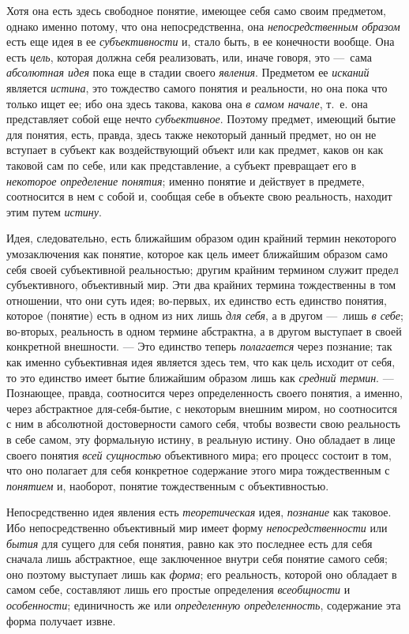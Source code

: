 \documentclass[twoside]{article}
\begin{document}
{Хотя она есть здесь свободное понятие, имеющее себя само своим
предметом, однако именно потому, что она непосредственна, она
{\em непосредственным образом}
есть еще идея в ее
{\em субъективности} и,
стало быть, в ее конечности вообще. Она есть
{\em цель}, которая
должна себя реализовать, или, иначе говоря, это —~сама
{\em абсолютная идея}
пока еще в стадии своего
{\em явления}. Предметом
ее {\em исканий} является
{\em истина}, это
тождество самого понятия и реальности, но она пока что только ищет ее; ибо
она здесь такова, какова она {\em в
самом начале}, т.~е. она представляет собой еще нечто
{\em субъективное}.
Поэтому предмет, имеющий бытие для понятия, есть, правда,
здесь также некоторый данный предмет, но он не вступает в субъект как
воздействующий объект или как предмет, каков он как таковой сам по себе,
или как представление, а субъект превращает его в
{\em некоторое определение понятия};
именно понятие и действует в предмете, соотносится в нем с
собой и, сообщая себе в объекте свою реальность, находит этим путем
{\em истину}.

Идея, следовательно, есть ближайшим образом один крайний
термин некоторого умозаключения как понятие, которое как цель имеет
ближайшим образом само себя своей субъективной реальностью; другим крайним
термином служит предел субъективного, объективный мир. Эти два крайних
термина тождественны в том отношении, что они суть идея; во-первых, их
единство есть единство понятия, которое (понятие) есть в одном из них лишь
{\em для себя}, а в
другом —~лишь {\em в
себе}; во-вторых, реальность в одном термине абстрактна, а в
другом выступает в своей конкретной внешности. — Это
единство теперь {\em полагается}
через познание; так как именно субъективная идея является
здесь тем, что как цель исходит от себя, то это единство имеет бытие
ближайшим образом лишь как {\em средний
термин}. — Познающее, правда, соотносится через
определенность своего понятия, а именно, через абстрактное
для-себя-бытие, с некоторым внешним миром, но соотносится с
ним в абсолютной достоверности самого себя, чтобы возвести свою реальность
в себе самом, эту формальную истину, в реальную истину. Оно обладает в лице
своего понятия {\em всей сущностью}
объективного мира; его процесс состоит в том, что оно
полагает для себя конкретное содержание этого мира тождественным с
{\em понятием} и,
наоборот, понятие тождественным с объективностью.

Непосредственно идея явления есть
{\em теоретическая} идея,
{\em познание} как
таковое. Ибо непосредственно объективный мир имеет форму
{\em непосредственности}
или {\em бытия}
для сущего для себя понятия, равно как это последнее есть для
себя сначала лишь абстрактное, еще заключенное внутри себя понятие самого
себя; оно поэтому выступает лишь как
{\em форма}; его
реальность, которой оно обладает в самом себе, составляют лишь его простые
определения {\em всеобщности}
и {\em особенности};
единичность же или
{\em определенную определенность},
содержание эта форма получает извне.

}
\end{document}

